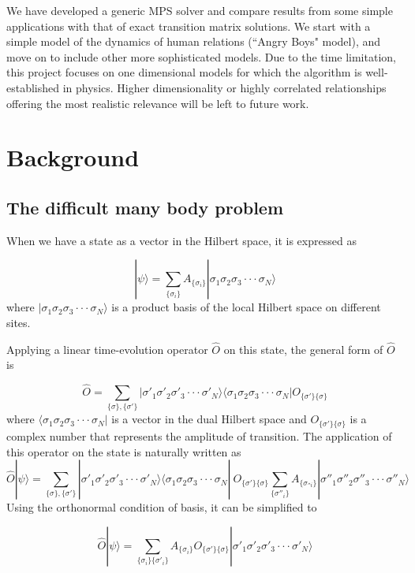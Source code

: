 \documentclass[english]{article}
\begin{document}
We have developed  a generic MPS solver and compare results from some simple applications with that of exact transition matrix solutions. We start with a simple model of the dynamics of human relations (``Angry Boys" model), and move on to include other more sophisticated models. Due to the time limitation, this project focuses on one dimensional models for which the algorithm is well-established in physics. Higher dimensionality or highly correlated relationships offering the most realistic relevance will be left to future work.

\section{Background}

\subsection{The difficult many body problem}

When we have a state as a vector in the Hilbert space, it is expressed
as

\[
|\psi\rangle=\sum_{\{\sigma_{i}\}}A_{\{\sigma_{i}\}}|\sigma_{1}\sigma_{2}\sigma_{3}\cdot\cdot\cdot\sigma_{N}\rangle
\]
where $|\sigma_{1}\sigma_{2}\sigma_{3}\cdot\cdot\cdot\sigma_{N}\rangle$
is a product basis of the local Hilbert space on different sites.

Applying a linear time-evolution operator $\hat{O}$ on this state,
the general form of $\hat{O}$ is

\[
\hat{O}=\sum_{\{\sigma\},\{\sigma'\}}|\sigma'_{1}\sigma'_{2}\sigma'_{3}\cdot\cdot\cdot\sigma'_{N}\rangle\langle\sigma_{1}\sigma_{2}\sigma_{3}\cdot\cdot\cdot\sigma_{N}|O_{\{\sigma'\}\{\sigma\}}
\]
where $\langle\sigma_{1}\sigma_{2}\sigma_{3}\cdot\cdot\cdot\sigma_{N}|$ is a vector in the dual Hilbert space and $O_{\{\sigma'\}\{\sigma\}}$ is a complex number that represents the amplitude of transition. The application of this operator on the state is naturally written as
\[
\hat{O}|\psi\rangle=\sum_{\{\sigma\},\{\sigma'\}}|\sigma'_{1}\sigma'_{2}\sigma'_{3}\cdot\cdot\cdot\sigma'_{N}\rangle\langle\sigma_{1}\sigma_{2}\sigma_{3}\cdot\cdot\cdot\sigma_{N}|\ O_{\{\sigma'\}\{\sigma\}}\sum_{\{\sigma''_{i}\}}A_{\{\sigma_{''i}\}}|\sigma''_{1}\sigma''_{2}\sigma''_{3}\cdot\cdot\cdot\sigma''_{N}\rangle
\]
Using the orthonormal condition of basis, it can be simplified to

\[
\hat{O}|\psi\rangle=\sum_{\{\sigma_{i}\}\{\sigma'_{i}\}}A_{\{\sigma_{i}\}}O_{\{\sigma'\}\{\sigma\}}|\sigma'_{1}\sigma'_{2}\sigma'_{3}\cdot\cdot\cdot\sigma'_{N}\rangle
\]
\end{document}
